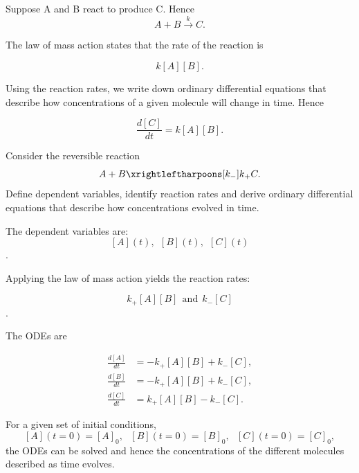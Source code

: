 \documentclass[
  letterpaper,
  DIV=11,
  numbers=noendperiod]{scrreprt}
\begin{document}
\begin{tcolorbox}[enhanced jigsaw, arc=.35mm, bottomrule=.15mm, bottomtitle=1mm, breakable, colback=white, colbacktitle=quarto-callout-note-color!10!white, colframe=quarto-callout-note-color-frame, coltitle=black, left=2mm, leftrule=.75mm, opacityback=0, opacitybacktitle=0.6, rightrule=.15mm, title=\textcolor{quarto-callout-note-color}{\faInfo}\hspace{0.5em}{Example}, titlerule=0mm, toprule=.15mm, toptitle=1mm]

Suppose A and B react to produce C. Hence \[
A+B\xrightarrow{k}  C.
\]

The law of mass action states that the rate of the reaction is

\[
k[A][B].
\]

Using the reaction rates, we write down ordinary differential equations
that describe how concentrations of a given molecule will change in
time. Hence

\[
\frac{d[C]}{dt}=k[A][B].
\]

\end{tcolorbox}

\begin{tcolorbox}[enhanced jigsaw, arc=.35mm, bottomrule=.15mm, bottomtitle=1mm, breakable, colback=white, colbacktitle=quarto-callout-note-color!10!white, colframe=quarto-callout-note-color-frame, coltitle=black, left=2mm, leftrule=.75mm, opacityback=0, opacitybacktitle=0.6, rightrule=.15mm, title=\textcolor{quarto-callout-note-color}{\faInfo}\hspace{0.5em}{Example}, titlerule=0mm, toprule=.15mm, toptitle=1mm]

Consider the reversible reaction \[
A+B  \xrightleftharpoons[k_{-}]{k_{+}}  C.
\] Define dependent variables, identify reaction rates and derive
ordinary differential equations that describe how concentrations evolved
in time.

The dependent variables are: \[ [A](t), \ \ [B](t), \ \ [C](t) \].

Applying the law of mass action yields the reaction rates:

\[ k_+[A][B] \ \ \textrm{and} \ \ k_-[C]\].

The ODEs are

\[
\begin{aligned}
\frac{d[A]}{dt}&=-k_+[A][B]+k_-[C], \nonumber\\
\frac{d[B]}{dt}&=-k_+[A][B]+k_-[C], \nonumber\\
\frac{d[C]}{dt}&=k_+[A][B]-k_-[C]. \nonumber
\end{aligned}
\]

For a given set of initial conditions, \[
[A](t=0)=[A]_0, \ \ \ [B](t=0)=[B]_0, \ \ \ [C](t=0)=[C]_0,
\] the ODEs can be solved and hence the concentrations of the different
molecules described as time evolves.

\end{tcolorbox}
\end{document}
